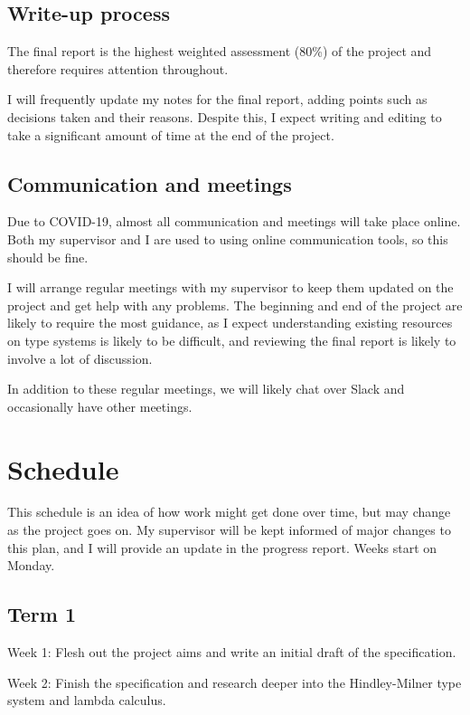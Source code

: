 \documentclass[12pt]{article}
\begin{document}
\subsection{Write-up process}

The final report is the highest weighted assessment (80\%) of the project and therefore requires attention throughout.

I will frequently update my notes for the final report, adding points such as decisions taken and their reasons. Despite this, I expect writing and editing to take a significant amount of time at the end of the project.

\subsection{Communication and meetings}

Due to COVID-19, almost all communication and meetings will take place online. Both my supervisor and I are used to using online communication tools, so this should be fine.

I will arrange regular meetings with my supervisor to keep them updated on the project and get help with any problems. The beginning and end of the project are likely to require the most guidance, as I expect understanding existing resources on type systems is likely to be difficult, and reviewing the final report is likely to involve a lot of discussion.

In addition to these regular meetings, we will likely chat over Slack and occasionally have other meetings.

\section{Schedule}

This schedule is an idea of how work might get done over time, but may change as the project goes on. My supervisor will be kept informed of major changes to this plan, and I will provide an update in the progress report. Weeks start on Monday.

\subsection{Term 1}

Week 1: Flesh out the project aims and write an initial draft of the specification.

Week 2: Finish the specification and research deeper into the Hindley-Milner type system and lambda calculus.
\end{document}
